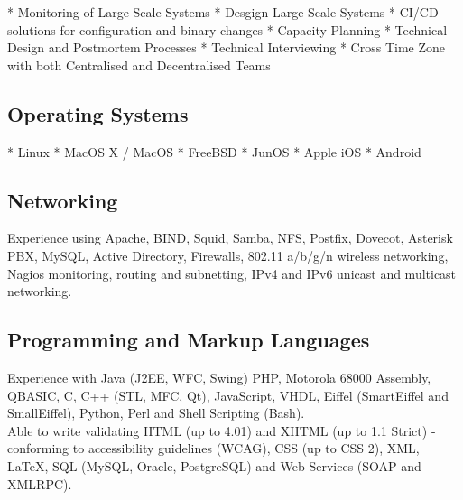 \documentclass[a4paper, 11pt] {article}
\begin{document}

* Monitoring of Large Scale Systems
* Desgign Large Scale Systems
* CI/CD solutions for configuration and binary changes
* Capacity Planning
* Technical Design and Postmortem Processes
* Technical Interviewing
* Cross Time Zone with both Centralised and Decentralised Teams

\subsection*{Operating Systems}

* Linux
* MacOS X / MacOS
* FreeBSD
* JunOS
* Apple iOS
* Android

\subsection*{Networking}


Experience using Apache, BIND, Squid, Samba, NFS, Postfix, Dovecot,
Asterisk PBX, MySQL, Active  Directory, Firewalls, 802.11 a/b/g/n wireless 
networking, Nagios monitoring, routing and subnetting, IPv4 and IPv6 
unicast and multicast networking.

\subsection*{Programming and Markup Languages}


Experience with Java (J2EE, WFC, Swing) PHP, Motorola 68000 Assembly, QBASIC,
C, C++ (STL, MFC, Qt), JavaScript, VHDL, Eiffel (SmartEiffel and 
SmallEiffel), Python, Perl and Shell Scripting (Bash). \\

Able to write validating HTML (up to 4.01) and XHTML (up 
to 1.1 Strict) - conforming to accessibility guidelines (WCAG), CSS (up to 
CSS 2), XML, LaTeX, SQL (MySQL, Oracle, PostgreSQL) and Web Services 
(SOAP and XMLRPC).
\end{document}
